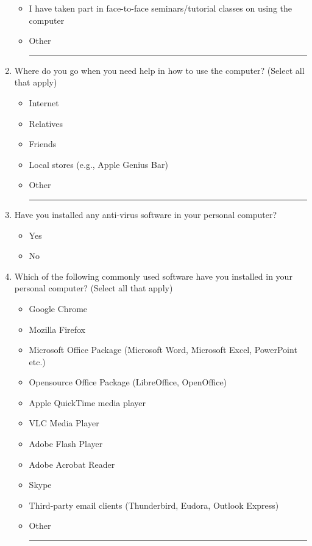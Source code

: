 \begin{enumerate}[topsep=-4em]
\begin{itemize}[topsep=-6em, label={o}]
\item I have taken part in face-to-face seminars/tutorial classes on using the computer
\item Other \rule{4cm}{0.4pt}
\end{itemize}
\item Where do you go when you need help in how to use the computer? (Select all that apply)
\begin{itemize}[topsep=-6em, label={o}]
\itemsep-1em 
\item Internet
\item Relatives
\item Friends
\item Local stores (e.g., Apple Genius Bar)
\item Other \rule{4cm}{0.4pt}
\end{itemize}
\item Have you installed any anti-virus software in your personal computer?
\begin{itemize}[topsep=-6em, label={o}]
\itemsep-1em 
\item Yes
\item No
\end{itemize}
\item Which of the following commonly used software have you installed in your personal computer? (Select all that apply)
\begin{itemize}[topsep=-6em, label={o}]
\itemsep-1em 
\item Google Chrome
\item Mozilla Firefox
\item Microsoft Office Package (Microsoft Word, Microsoft Excel, PowerPoint etc.)
\item Opensource Office Package (LibreOffice, OpenOffice)
\item Apple QuickTime media player
\item VLC Media Player
\item Adobe Flash Player
\item Adobe Acrobat Reader
\item Skype
\item Third-party email clients (Thunderbird, Eudora, Outlook Express)
\item Other \rule{4cm}{0.4pt}
\end{itemize}
\end{enumerate}
